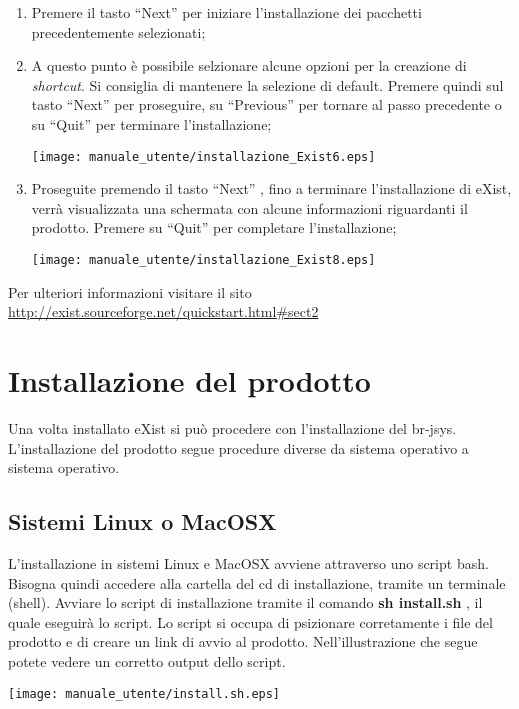 \begin{enumerate}
\item Premere il tasto ``Next'' per iniziare l'installazione dei pacchetti precedentemente selezionati;
\item A questo punto \`e possibile selzionare alcune opzioni per la creazione di \textit{shortcut}. Si consiglia di mantenere la selezione di default. Premere quindi sul tasto ``Next'' per proseguire, su ``Previous'' per tornare al passo precedente o su ``Quit'' per terminare l'installazione;
\begin{center}
\texttt{[image: manuale\_utente/installazione\_Exist6.eps]}\\
\end{center}
\item Proseguite premendo il tasto ``Next'' , fino a terminare l'installazione di eXist, verr\`a visualizzata una schermata con alcune informazioni riguardanti il prodotto. Premere su ``Quit'' per completare l'installazione;
\begin{center}
\texttt{[image: manuale\_utente/installazione\_Exist8.eps]}\\
\end{center}
\end{enumerate}
Per ulteriori informazioni visitare il sito\\
 \href{http://exist.sourceforge.net/quickstart.html\#sect2}{ http://exist.sourceforge.net/quickstart.html\#sect2}

\section{Installazione del prodotto}
Una volta installato eXist si pu\`o procedere con l'installazione del br-jsys.
L'installazione del prodotto segue procedure diverse da sistema operativo a sistema operativo.

\subsection{Sistemi Linux o MacOSX}
L'installazione in sistemi Linux e MacOSX avviene attraverso uno script bash. Bisogna quindi  accedere alla cartella del cd di installazione,  tramite un terminale (shell). Avviare lo script di installazione tramite il comando \textbf{sh install.sh} , il quale eseguir\`a lo script.
Lo script si occupa di psizionare corretamente i file del prodotto e di creare un link di avvio al prodotto.
Nell'illustrazione che segue potete vedere un corretto output dello script.\\
\begin{center}
\texttt{[image: manuale\_utente/install.sh.eps]}\\
\end{center}

